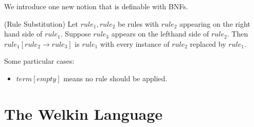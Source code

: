 We introduce one new notion that is definable with BNFs.
\begin{definition} (Rule Substitution) Let $rule_{1}, rule_{2}$ be rules with $rule_{2}$ appearing on the right hand side of $rule_{1}.$ Suppose $rule_{3}$ appears on the lefthand side of $rule_{2}.$ Then $rule_{1}[rule_{2}\to rule_{3}]$ is $rule_{1}$ with every instance of $rule_{2}$ replaced by $rule_{1}.$

Some particular cases:
\begin{itemize}
\item $term[empty]$ means no rule should be applied.
\end{itemize}

\end{definition}
\section{The Welkin Language}

